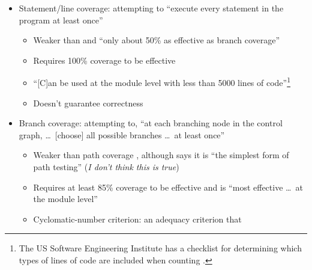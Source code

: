 \begin{itemize}
      \item Statement/line coverage: attempting to ``execute every statement in
            the program at least once'' \citep[p.~119]{Patton2006}
            \begin{itemize}
                  \item Weaker than \citep[p.~421]{vanVliet2000} and
                        ``only about 50\% as effective as branch coverage''
                        \citep[p.~481]{PetersAndPedrycz2000}
                  \item Requires 100\% coverage to be effective
                        \citep[p.~481]{PetersAndPedrycz2000}
                  \item ``[C]an be used at the module level with less than 5000
                        lines of code''\footnote{The US Software Engineering
                              Institute has a checklist for determining which
                              types of lines of code are included when counting
                              \citep[pp.~30-31]{FentonAndPfleeger1997}.
                        } \citep[p.~481]{PetersAndPedrycz2000}
                  \item Doesn't guarantee correctness
                        \citep[p.~421]{vanVliet2000}
            \end{itemize}
      \item Branch coverage: attempting to, ``at each branching node in the
            control graph, \dots\ [choose] all possible branches \dots\ at least
            once'' \citep[p.~421]{vanVliet2000}
            \begin{itemize}
                  \item Weaker than path coverage
                        \citep[p.~433]{vanVliet2000}, although
                        \citep[p.~119]{Patton2006} says it is
                        ``the simplest form of path testing''
                        (\emph{I don't think this is true})
                  \item Requires at least 85\% coverage to be effective and is
                        ``most effective \dots\ at the module level''
                        \citep[p.~481]{PetersAndPedrycz2000}
                  \item Cyclomatic-number criterion: an adequacy criterion that

\end{itemize}
\end{itemize}
